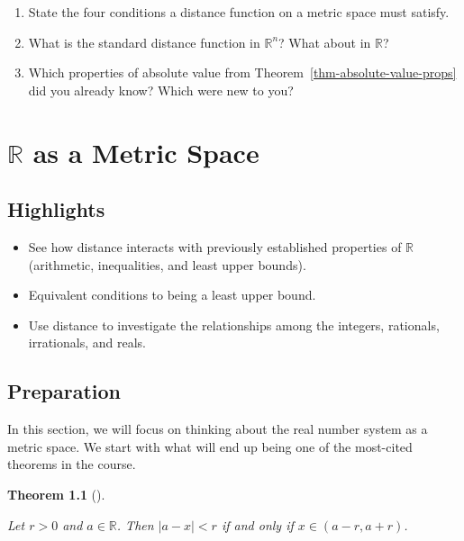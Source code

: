 \documentclass[
  letterpaper,
  DIV=11,
  numbers=noendperiod]{scrreprt}
\providecommand{\tightlist}{%
  \setlength{\itemsep}{0pt}\setlength{\parskip}{0pt}}
\def\R{\mathbb R}
\theoremstyle{plain}
\newtheorem{theorem}{Theorem}[chapter]
\theoremstyle{definition}
\theoremstyle{plain}
\theoremstyle{plain}
\theoremstyle{definition}
\theoremstyle{definition}
\theoremstyle{remark}
\begin{document}

\begin{enumerate}
\def\labelenumi{\arabic{enumi}.}
\tightlist
\item
  State the four conditions a distance function on a metric space must
  satisfy.
\item
  What is the standard distance function in \(\R^n\)? What about in
  \(\R\)?
\item
  Which properties of absolute value from
  Theorem~\ref{thm-absolute-value-props} did you already know? Which
  were new to you?
\end{enumerate}

\chapter{\texorpdfstring{\(\mathbb{R}\) as a Metric
Space}{\textbackslash mathbb\{R\} as a Metric Space}}\label{mathbbr-as-a-metric-space}

\section*{Highlights}\label{highlights-4}


\begin{itemize}
\tightlist
\item
  See how distance interacts with previously established properties of
  \(\R\) (arithmetic, inequalities, and least upper bounds).
\item
  Equivalent conditions to being a least upper bound.
\item
  Use distance to investigate the relationships among the integers,
  rationals, irrationals, and reals.
\end{itemize}

\section{Preparation}\label{preparation-4}

In this section, we will focus on thinking about the real number system
as a metric space. We start with what will end up being one of the
most-cited theorems in the course.

\begin{theorem}[]\protect\hypertarget{thm-open-ball-in-r}{}\label{thm-open-ball-in-r}

Let \(r>0\) and \(a\in\R\). Then \(|a-x|<r\) if and only if
\(x\in(a-r,a+r)\).

\end{theorem}
\end{document}
